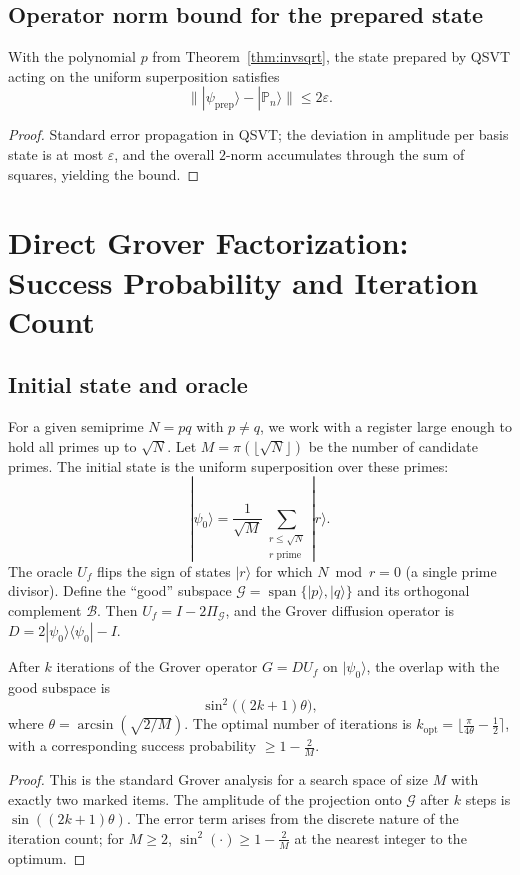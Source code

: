 \documentclass[12pt,a4paper]{article}
\begin{document}
\subsection{Operator norm bound for the prepared state}
\begin{corollary}
With the polynomial \(p\) from Theorem~\ref{thm:invsqrt}, the state prepared by QSVT acting on the uniform superposition satisfies
\[
\bigl\| |\psi_{\text{prep}}\rangle - |\mathbb{P}_n\rangle \bigr\| \le 2\varepsilon .
\]
\end{corollary}
\begin{proof}
Standard error propagation in QSVT; the deviation in amplitude per basis state is at most \(\varepsilon\), and the overall \(2\)-norm accumulates through the sum of squares, yielding the bound.
\end{proof}

\section{Direct Grover Factorization: Success Probability and Iteration Count}

\subsection{Initial state and oracle}
For a given semiprime \(N = pq\) with \(p\neq q\), we work with a register large enough to hold all primes up to \(\sqrt{N}\).  Let \(M = \pi(\lfloor\sqrt{N}\rfloor)\) be the number of candidate primes.  The initial state is the uniform superposition over these primes:
\[
|\psi_0\rangle = \frac{1}{\sqrt{M}} \sum_{\substack{r\le \sqrt{N}\\ r\text{ prime}}} |r\rangle .
\]
The oracle \(U_f\) flips the sign of states \(|r\rangle\) for which \(N \bmod r = 0\) (a single prime divisor).  Define the “good” subspace \(\mathcal{G} = \operatorname{span}\{|p\rangle, |q\rangle\}\) and its orthogonal complement \(\mathcal{B}\).  Then \(U_f = I - 2\Pi_{\mathcal{G}}\), and the Grover diffusion operator is \(D = 2|\psi_0\rangle\langle\psi_0| - I\).

\begin{theorem}\label{thm:grover}
After \(k\) iterations of the Grover operator \(G = D U_f\) on \(|\psi_0\rangle\), the overlap with the good subspace is
\[
\sin^2\bigl((2k+1)\theta\bigr),
\]
where \(\theta = \arcsin(\sqrt{2/M})\).  The optimal number of iterations is \(k_{\text{opt}} = \lfloor \frac{\pi}{4\theta} - \frac{1}{2} \rceil\), with a corresponding success probability \(\ge 1 - \frac{2}{M}\).
\end{theorem}
\begin{proof}
This is the standard Grover analysis for a search space of size \(M\) with exactly two marked items.  The amplitude of the projection onto \(\mathcal{G}\) after \(k\) steps is \(\sin((2k+1)\theta)\).  The error term arises from the discrete nature of the iteration count; for \(M\ge 2\), \(\sin^2(\cdot)\ge 1 - \frac{2}{M}\) at the nearest integer to the optimum.
\end{proof}
\end{document}
